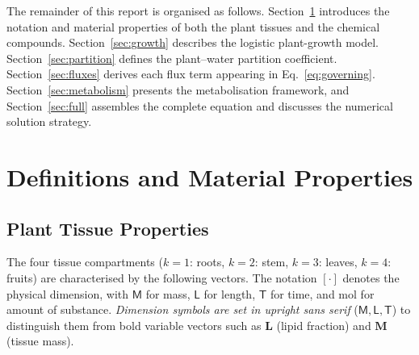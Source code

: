 \documentclass[12pt,a4paper]{article}
\newcommand{\dM}{\mathsf{M}}
\newcommand{\dL}{\mathsf{L}}
\newcommand{\dT}{\mathsf{T}}
\begin{document}
The remainder of this report is organised as follows.  Section~\ref{sec:definitions} introduces the notation and material properties of both the plant tissues and the chemical compounds.  Section~\ref{sec:growth} describes the logistic plant-growth model.  Section~\ref{sec:partition} defines the plant--water partition coefficient.  Section~\ref{sec:fluxes} derives each flux term appearing in Eq.~\eqref{eq:governing}.  Section~\ref{sec:metabolism} presents the metabolisation framework, and Section~\ref{sec:full} assembles the complete equation and discusses the numerical solution strategy.


\section{Definitions and Material Properties}\label{sec:definitions}

\subsection{Plant Tissue Properties}

The four tissue compartments ($k=1$: roots, $k=2$: stem, $k=3$: leaves, $k=4$: fruits) are characterised by the following vectors.  The notation $[\cdot]$ denotes the physical dimension, with $\dM$ for mass, $\dL$ for length, $\dT$ for time, and $\mathrm{mol}$ for amount of substance.  \emph{Dimension symbols are set in upright sans serif} ($\dM,\dL,\dT$) to distinguish them from bold variable vectors such as $\mathbf{L}$ (lipid fraction) and $\mathbf{M}$ (tissue mass).
\end{document}
